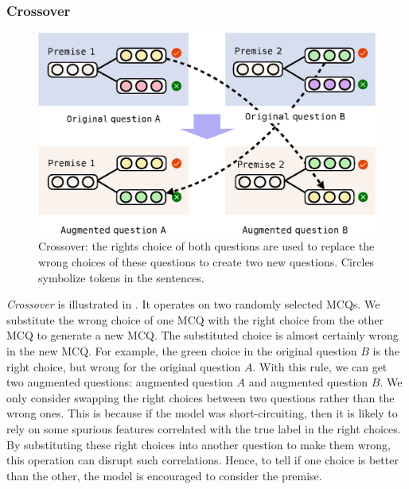 \subsubsection{Crossover}
\label{sec:crossover}
\begin{figure}[th]
        \centering
        \includegraphics[width=0.60\columnwidth]{figure/aug.eps}
        \caption{Crossover: the rights choice of both questions
                are used to replace the wrong choices of these questions to create
                two new questions. Circles symbolize tokens in the sentences.
        } 
        \label{fig:cross}
\end{figure}

\textit{Crossover} is illustrated in . It operates 
on two randomly selected MCQs.
We substitute the wrong choice of one MCQ with the right choice from 
the other MCQ to generate a new MCQ. The substituted choice is 
almost certainly wrong in the new MCQ. 
For example, the green choice in the original question $B$ is the right choice, 
but wrong for the original question ${A}$. With this rule, we can get two augmented 
questions: augmented question ${A}$ and augmented question ${B}$.
We only consider swapping the right choices between 
two questions rather than the wrong ones. 
This is because if the model was short-circuiting,
then it is likely to rely on some spurious features correlated with the true
label in the right choices. 
By substituting these right choices into another question to make them wrong, 
this operation can disrupt such correlations.
Hence, to tell if one choice is better than the other, 
the model is encouraged to consider the premise. 

